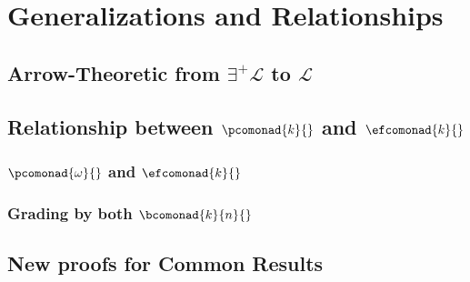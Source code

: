 \chapter{Generalizations and Relationships}
\section{Arrow-Theoretic from $\exists^{+}\mathcal{L}$ to $\mathcal{L}$}
\section{Relationship between $\pcomonad{k}{}$ and $\efcomonad{k}{}$}
\subsection{$\pcomonad{\omega}{}$ and $\efcomonad{k}{}$}
\subsection{Grading by both $\bcomonad{k}{n}{}$}
\section{New proofs for Common Results}
